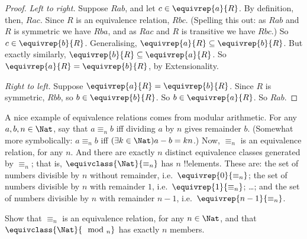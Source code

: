 \documentclass[../../../include/open-logic-section]{subfiles}
\begin{document}
\begin{proof}
	\emph{Left to right.} Suppose $Rab$, and let $c \in \equivrep{a}{R}$. By definition, then, $Rac$. Since $R$ is an equivalence relation, $Rbc$. (Spelling this out: as $Rab$ and $R$ is symmetric we have $Rba$, and as $Rac$ and $R$ is transitive we have $Rbc$.) So $c \in \equivrep{b}{R}$. Generalising, $\equivrep{a}{R} \subseteq \equivrep{b}{R}$. But exactly similarly, $\equivrep{b}{R} \subseteq \equivrep{a}{R}$. So $\equivrep{a}{R} = \equivrep{b}{R}$, by Extensionality.
	
	\emph{Right to left.} Suppose $\equivrep{a}{R} = \equivrep{b}{R}$. Since $R$ is symmetric, $Rbb$, so $b \in \equivrep{b}{R}$. So $b \in \equivrep{a}{R}$. So $Rab$.
\end{proof}
\begin{ex}
	 A nice example of equivalence relations comes from modular arithmetic. For any $a, b, n \in \Nat$, say that $a \equiv_n b$ iff dividing $a$ by $n$ gives remainder $b$. (Somewhat more symbolically: $a \equiv_n b$ iff $(\exists k \in \Nat)a -b = kn$.) Now, $\equiv_n$ is an equivalence relation, for any $n$. And there are exactly $n$ distinct equivalence classes generated by $\equiv_n$; that is, $\equivclass{\Nat}{\equiv_n}$ has $n$ !!{element}s. These are: the set of numbers divisible by $n$ without remainder, i.e.\ $\equivrep{0}{\equiv_n}$; the set of numbers divisible by $n$ with remainder $1$, i.e.\ $\equivrep{1}{\equiv_n}$; \ldots; and the set of numbers divisible by $n$ with remainder $n-1$, i.e.\ $\equivrep{n-1}{\equiv_n}$. 
\end{ex}
\begin{prob}
	Show that $\equiv_n$ is an equivalence relation, for any $n \in \Nat$, and that $\equivclass{\Nat}{\mod_n}$ has exactly $n$ members.
\end{prob}
\end{document}
